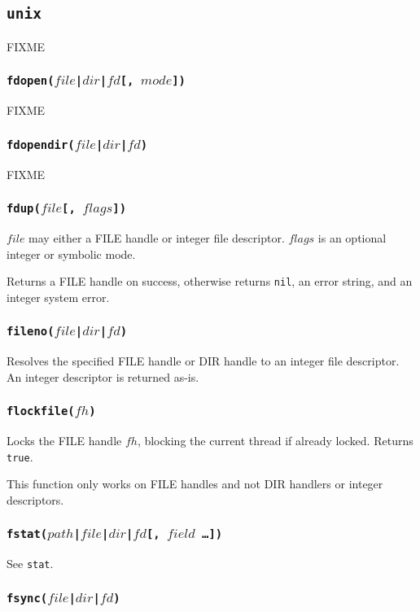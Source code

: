 \documentclass[11pt, oneside]{memoir}
\newcommand*{\true}[0]{\texttt{true}\xspace}
\newcommand*{\nil}[0]{\texttt{nil}\xspace}
\newcommand*{\fn}[1]{\texttt{#1}\xspace}
\newcounter{toccols}
\newenvironment{Module}[1]{
	\subsection{\texttt{#1}}
	\addtocontents{toc}{
		\protect\begin{multicols}{\value{toccols}}
	}
}{
	\addtocontents{toc}{\protect\end{multicols}}
}
\begin{document}
\begin{Module}{unix}
FIXME

\subsubsection[\fn{fdopen}]{\fn{fdopen($file$|$dir$|$fd$[, $mode$])}}

FIXME

\subsubsection[\fn{fdopendir}]{\fn{fdopendir($file$|$dir$|$fd$)}}

FIXME

\subsubsection[\fn{fdup}]{\fn{fdup($file$[, $flags$])}}

$file$ may either a FILE handle or integer file descriptor. $flags$ is an optional integer or symbolic mode.

Returns a FILE handle on success, otherwise returns \nil, an error string, and an integer system error.

\subsubsection[\fn{fileno}]{\fn{fileno($file$|$dir$|$fd$)}}

Resolves the specified FILE handle or DIR handle to an integer file descriptor. An integer descriptor is returned as-is.

\subsubsection[\fn{flockfile}]{\fn{flockfile($fh$)}}

Locks the FILE handle $fh$, blocking the current thread if already locked. Returns \true.

This function only works on FILE handles and not DIR handlers or integer descriptors.

\subsubsection[\fn{fstat}]{\fn{fstat($path$|$file$|$dir$|$fd$[, $field$ \ldots])}}

See \fn{stat}.

\subsubsection[\fn{fsync}]{\fn{fsync($file$|$dir$|$fd$)}}


\end{Module}
\end{document}
